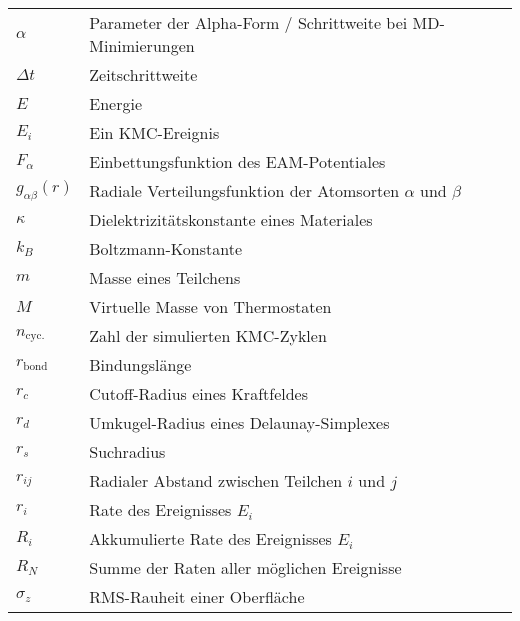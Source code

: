 \begin{tabular}{ll}
$\alpha$             & Parameter der Alpha-Form / Schrittweite bei MD-Minimierungen    \\
$\Delta t$           & Zeitschrittweite                                                \\
$E$                  & Energie                                                         \\
$E_i$                & Ein KMC-Ereignis                                                \\
$F_\alpha$           & Einbettungsfunktion des EAM-Potentiales                         \\
$g_{\alpha\beta}(r)$ & Radiale Verteilungsfunktion der Atomsorten $\alpha$ und $\beta$ \\
$\kappa$             & Dielektrizitätskonstante eines Materiales                       \\
$k_B$                & Boltzmann-Konstante                                             \\
$m$                  & Masse eines Teilchens                                           \\
$M$                  & Virtuelle Masse von Thermostaten                                \\
$n_\text{cyc.}$      & Zahl der simulierten KMC-Zyklen                                 \\
$r_\text{bond}$      & Bindungslänge                                                   \\
$r_c$                & Cutoff-Radius eines Kraftfeldes                                 \\
$r_d$                & Umkugel-Radius eines Delaunay-Simplexes                         \\
$r_s$                & Suchradius                                                      \\
$r_{ij}$             & Radialer Abstand zwischen Teilchen $i$ und $j$                  \\
$r_i$                & Rate des Ereignisses $E_i$                                      \\
$R_i$                & Akkumulierte Rate des Ereignisses $E_i$                         \\
$R_N$                & Summe der Raten aller möglichen Ereignisse                      \\
$\sigma_z$           & RMS-Rauheit einer Oberfläche                                    \\

\end{tabular}
